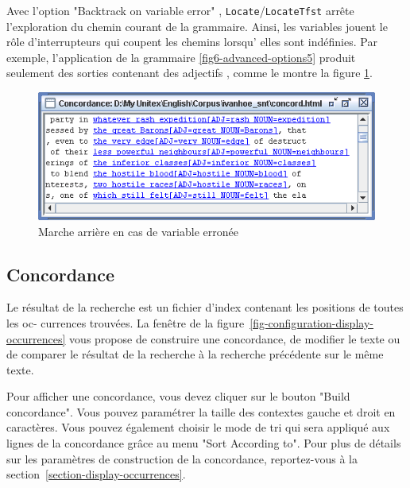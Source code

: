 \noindent Avec l'option "Backtrack on variable error" ,
\verb+Locate+/\verb+LocateTfst+ arrête l'exploration du chemin courant de la
grammaire. Ainsi, les variables jouent  le rôle d'interrupteurs qui coupent les chemins
lorsqu' elles sont indéfinies. Par exemple, l'application de la grammaire
\ref{fig6-advanced-options5} produit seulement des sorties contenant des adjectifs
, comme le montre la figure \ref{fig6-advanced-options8}. 

\bigskip
\begin{figure}[!ht]
\begin{center}
\includegraphics[width=13cm]{resources/img/fig6-advanced-options8.png}
\caption{Marche arrière en cas de variable erronée\label{fig6-advanced-options8}}
\end{center}
\end{figure}



\subsection{Concordance}
Le résultat de la recherche est un fichier d’index contenant les positions de toutes les oc-
currences trouvées. La fenêtre de la figure~\ref{fig-configuration-display-occurrences}                                               vous propose de construire une concordance,
de modifier le texte ou de comparer le résultat de la recherche à la recherche précédente sur
le même texte.


\bigskip
{}
\noindent Pour afficher une concordance, vous devez cliquer sur le bouton "Build concordance".
Vous pouvez paramétrer la taille des contextes gauche et droit en caractères. Vous pouvez
également choisir le mode de tri qui sera appliqué aux lignes de la concordance grâce au
menu "Sort According to". Pour plus de détails sur les paramètres de construction de la
concordance, reportez-vous à la section~\ref{section-display-occurrences}.

